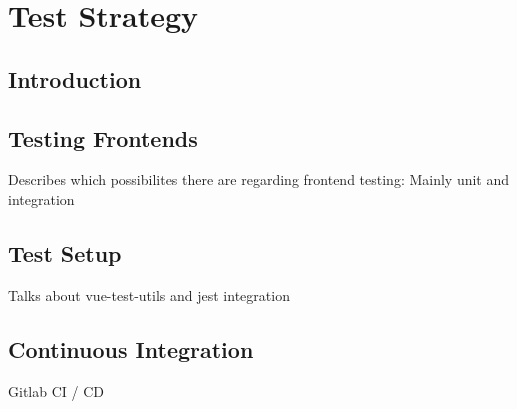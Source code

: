 \chapter[Test Strategy]{Test Strategy}

\section{Introduction}

\section{Testing Frontends}
Describes which possibilites there are regarding frontend testing: Mainly unit and integration

\section{Test Setup}
Talks about vue-test-utils and jest integration

\section{Continuous Integration}
Gitlab CI / CD